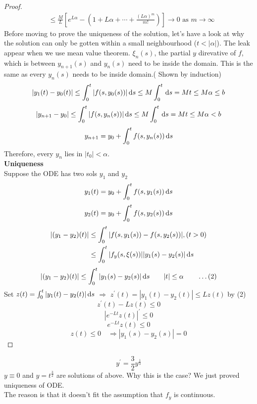 \begin{proof}
\[\begin{aligned}
&\leq\frac{M}{L}[e^{L\alpha}-(1+L\alpha+\cdots+\frac{(L\alpha)^m}{m!})]\rightarrow 0 \text{ as } m\rightarrow\infty
\end{aligned}
\]
Before moving to prove the uniqueness of the solution, let's have a look at why the solution can only be gotten within a small neighbourhood ($t<|\alpha|$). The leak appear when we use mean value theorem. $\xi_n(s)$, the partial $y$ direvative of $f$, which is between $y_{n+1}(s)$  and $y_n(s)$ need to be inside the domain. This is the same as every $y_n(s)$ needs to be inside domain.( Shown by induction)\\
\[|y_1(t)-y_0(t)|\leq\int_0^t|f(s,y_0(s))|\,\mathrm{d} s\leq M\int_0^t\,\mathrm{d} s=Mt\leq M\alpha\leq b
\]
\[|y_{n+1}-y_0|\leq\int_0^t|f(s,y_n(s))|\,\mathrm{d} s\leq M\int_0^t\,\mathrm{d} s=Mt\leq M\alpha<b
\]
\[y_{n+1}=y_0+\int_0^tf(s,y_n(s))\,\mathrm{d} s
\]
Therefore, every $y_n$ lies in $|t_0|<\alpha$.\\
\textbf{Uniqueness}\\
Suppose the ODE has two sols $y_1$ and $y_2$
\[y_1(t)=y_0+\int_0^tf(s,y_1(s))\,\mathrm{d} s
\]
\[y_2(t)=y_0+\int_0^tf(s,y_2(s))\,\mathrm{d} s
\]
\[\begin{aligned}|(y_1-y_2)(t)|&\leq\int_0^t|f(s,y_1(s))-f(s,y_2(s))|,(t>0)\\
&\leq\int_0^t|f_y(s,\xi(s))||y_1(s)-y_2(s)|\,\mathrm{d} s
\end{aligned}
\]
\[|(y_1-y_2)(t)|\leq\int_0^t|y_1(s)-y_2(s)|\,\mathrm{d} s\qquad |t|\leq\alpha\qquad\dots(2)
\]
Set $z(t)=\int_0^t|y_1(t)-y_2(t)|\,\mathrm{d} s$ $\Rightarrow$ $z^\prime(t)=|y_1(t)-y_2(t)|\leq Lz(t)$ by (2)
\[z^\prime(t)-Lz(t)\leq0
\]
\[|e^{-Lt}z(t)|^\prime\leq0
\]
\[e^{-Lt}z(t)\leq0
\]
\[z(t)\leq0\quad\Rightarrow|y_1(s)-y_2(s)|=0
\]


\end{proof}
 \begin{example}
 \[y^\prime=\frac{3}{2}y^{\frac{1}{3}}
 \]
 $y\equiv0$ and  $y=t^{\frac{3}{2}}$ are solutions of above. Why this is the case? We just proved uniqueness of ODE.\\ The reason is that it doesn't fit the assumption that $f_y$ is continuous.
 \end{example}
 
 
 
 
 